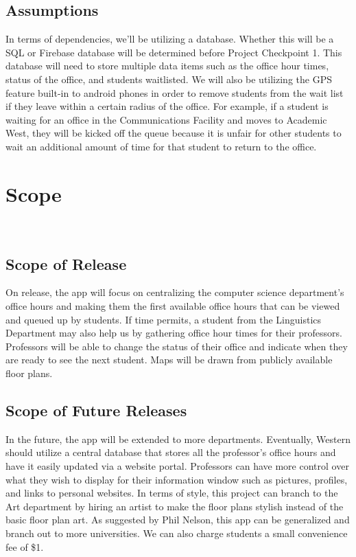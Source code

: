 \documentclass[11pt]{article} %
\begin{document}
\subsection{Assumptions}
In terms of dependencies, we'll be utilizing a database. Whether this will be a SQL or Firebase database will be determined before Project Checkpoint 1. This database will need to store multiple data items such as the office hour times, status of the office, and students waitlisted. We will also be utilizing the GPS feature built-in to android phones in order to remove students from the wait list if they leave within a certain radius of the office. For example, if a student is waiting for an office in the Communications Facility and moves to Academic West, they will be kicked off the queue because it is unfair for other students to wait an additional amount of time for that student to return to the office. 

\pagebreak

\section{Scope}

\\
\subsection{Scope of Release}
On release, the app will focus on centralizing the computer science department's office hours and making them the first available office hours that can be viewed and queued up by students. If time permits, a student from the Linguistics Department may also help us by gathering office hour times for their professors. Professors will be able to change the status of their office and indicate when they are ready to see the next student. Maps will be drawn from publicly available floor plans.
\subsection{Scope of Future Releases}
In the future, the app will be extended to more departments. Eventually, Western should utilize a central database that stores all the professor's office hours and have it easily updated via a website portal. Professors can have more control over what they wish to display for their information window such as pictures, profiles, and links to personal websites. In terms of style, this project can branch to the Art department by hiring an artist to make the floor plans stylish instead of the basic floor plan art. As suggested by Phil Nelson, this app can be generalized and branch out to more universities. We can also charge students a small convenience fee of \$1.\
\end{document}
